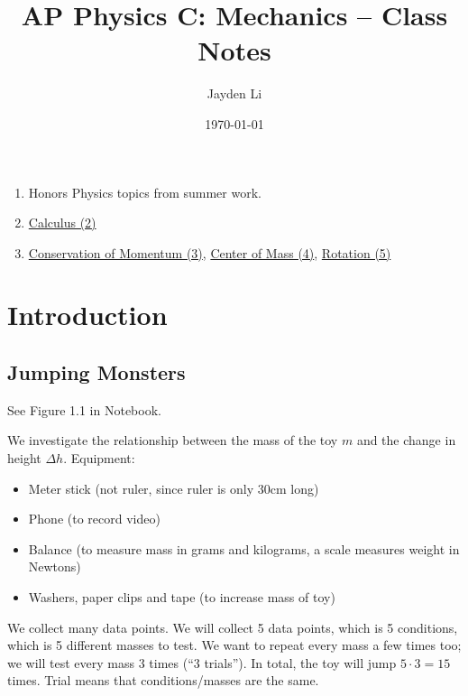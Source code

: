 \documentclass{article}
\title{\vspace*{-40pt}AP Physics C: Mechanics -- Class Notes}
\author{Jayden Li}
\date{\today}
\begin{document}
\fontsize{11pt}{12pt}\selectfont
\setlength{\abovedisplayskip}{\abovedisplayskip/2}
\setlength{\belowdisplayskip}{\belowdisplayskip/2}
\setlength{\parindent}{0pt}
\setlength{\parskip}{2ex plus 0.5ex minus 0.2ex}
\maketitle

\tableofcontents

\begin{tcolorbox}[title={Summative Assessment Topics},colback=green!5!white,colframe=green!75!black,parbox=false]
	\begin{enumerate}[label={SA\arabic*.}]
		\item Honors Physics topics from summer work.
		\item \hyperref[sec:calculus]{Calculus (2)}
		\item \hyperref[sec:momentum]{Conservation of Momentum (3)}, \hyperref[sec:centerofmass]{Center of Mass (4)}, \hyperref[sec:rotation]{Rotation (5)}
	\end{enumerate}
\end{tcolorbox}


\section{Introduction}

\subsection{Jumping Monsters}

See Figure 1.1 in Notebook.

We investigate the relationship between the mass of the toy $m$ and the change in height $\Delta h$. Equipment:
\begin{itemize}
	\item Meter stick (not ruler, since ruler is only 30cm long)
	\item Phone (to record video)
	\item Balance (to measure mass in grams and kilograms, a scale measures weight in Newtons)
	\item Washers, paper clips and tape (to increase mass of toy)
\end{itemize}

We collect many data points. We will collect 5 data points, which is 5 conditions, which is 5 different masses to test.  We want to repeat every mass a few times too; we will test every mass 3 times (``3 trials''). In total, the toy will jump $5\cdot 3=15$ times. Trial means that conditions/masses are the same.
\end{document}
